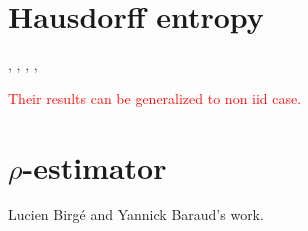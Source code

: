 \documentclass[11pt]{article}
\newcommand\CG[1]{\textcolor{red}{#1}}
\theoremstyle{plain}
\theoremstyle{definition}
\theoremstyle{remark}
\begin{document}
\section{Hausdorff entropy}
\cite{Xing2008},
\cite{Xing2009},
\cite{Xing2010},
\cite{Xing2015},

\CG{Their results can be generalized to non iid case.}


\section{$\rho$-estimator}
Lucien Birg\'e and Yannick Baraud's work.






\end{document}
